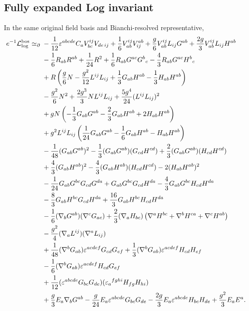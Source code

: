 \documentclass[11pt]{article}
\newcommand{\cL}{\mathcal L}
\newcommand{\eps}{\varepsilon}
\newcommand{\simeqbd}{\mathrel{\simeq}_{\partial}}
\newcommand{\Log}{\log}
\begin{document}
\subsection{Fully expanded Log invariant}

In the same original field basis and Bianchi-resolved representative,
\begingroup
\small
\begin{align}
e^{-1}\cL_{\Log}^{\rm bos}\simeqbd{}&
-\frac1{12}\eps^{abcde}C_aV_{bc}^{ij}V_{de\,ij}
+\frac16V_{ab}^{ij}V^{ab}_{ij}
+\frac g6V_{ab}^{ij}L_{ij}G^{ab}
+\frac{2g}{3}V_{ab}^{ij}L_{ij}H^{ab}
\nonumber\\
&-\frac16R_{ab}R^{ab}+\frac1{24}R^2
+\frac16R_{ab}G^{ac}G^b{}_c
-\frac43R_{ab}G^{ac}H^b{}_c
\nonumber\\
&+R\left(\frac g6N-\frac{g^2}{12}L^{ij}L_{ij}
+\frac13G_{ab}H^{ab}-\frac13H_{ab}H^{ab}\right)
\nonumber\\
&-\frac{g^2}{6}N^2+\frac{2g^3}{3}N L^{ij}L_{ij}
+\frac{5g^4}{24}(L^{ij}L_{ij})^2
\nonumber\\
&+gN\left(-\frac13G_{ab}G^{ab}-\frac23G_{ab}H^{ab}
+2H_{ab}H^{ab}\right)
\nonumber\\
&+g^2L^{ij}L_{ij}\left(\frac1{24}G_{ab}G^{ab}
-\frac16G_{ab}H^{ab}-H_{ab}H^{ab}\right)
\nonumber\\
&-\frac1{48}(G_{ab}G^{ab})^2
-\frac13(G_{ab}G^{ab})(G_{cd}H^{cd})
+\frac23(G_{ab}G^{ab})(H_{cd}H^{cd})
\nonumber\\
&+\frac43(G_{ab}H^{ab})^2
-\frac43(G_{ab}H^{ab})(H_{cd}H^{cd})
-2(H_{ab}H^{ab})^2
\nonumber\\
&-\frac1{24}G_{ab}G^{bc}G_{cd}G^{da}
+G_{ab}G^{bc}G_{cd}H^{da}
-\frac43G_{ab}G^{bc}H_{cd}H^{da}
\nonumber\\
&-\frac83G_{ab}H^{bc}G_{cd}H^{da}
+\frac{16}{3}G_{ab}H^{bc}H_{cd}H^{da}
\nonumber\\
&-\frac16(\nabla_bG^{ab})(\nabla^cG_{ac})
+\frac23(\nabla_aH_{bc})
\left(\nabla^aH^{bc}+\nabla^bH^{ca}+\nabla^cH^{ab}\right)
\nonumber\\
&-\frac{g^2}{4}(\nabla_aL^{ij})(\nabla^aL_{ij})
\nonumber\\
&+\frac1{48}(\nabla^bG_{ab})\eps^{acdef}G_{cd}G_{ef}
+\frac13(\nabla^bG_{ab})\eps^{acdef}H_{cd}H_{ef}
\nonumber\\
&-\frac16(\nabla^bG_{ab})\eps^{acdef}H_{cd}G_{ef}
\nonumber\\
&+\frac1{12}(\eps^{abcde}G_{bc}G_{de})
(\eps_{a}{}^{fghi}H_{fg}H_{hi})
\nonumber\\
&+\frac g3E_a\nabla_bG^{ab}
-\frac g{24}E_a\eps^{abcde}G_{bc}G_{de}
-\frac{2g}{3}E_a\eps^{abcde}H_{bc}H_{de}
+\frac{g^2}{3}E_aE^a.
\label{eq:L-final-expanded}
\end{align}
\endgroup
\end{document}

